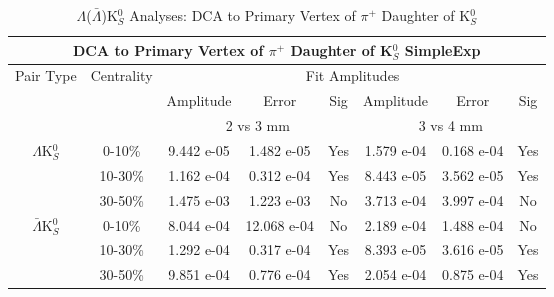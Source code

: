 \documentclass[../AnalysisNoteJBuxton.tex]{subfiles}
\begin{document}
\begin{table}
 \centering
 \begin{tabular}{|c|c|c|c|c||c|c|c|}
  \multicolumn{8}{c}{DCA to Primary Vertex of $\pi^{+}$ Daughter of K$^{0}_{S}$ SimpleExp} \\
  \hline
  \multirow{3}{*}{Pair Type} & \multirow{3}{*}{Centrality} & \multicolumn{6}{c|}{Fit Amplitudes} \\
  \cline{3-8}
   & & Amplitude & Error & Sig & Amplitude & Error & Sig \\  
  \cline{3-8}
   & & \multicolumn{3}{c||}{2 vs 3 mm} & \multicolumn{3}{c|}{3 vs 4 mm} \\  
  \hline  
  \multirow{3}{*}{$\Lambda$K$^{0}_{S}$}  
   &  0-10\% & 9.442 e-05 & 1.482 e-05 & Yes & 1.579 e-04 & 0.168 e-04 & Yes \\
   & 10-30\% & 1.162 e-04 & 0.312 e-04 & Yes & 8.443 e-05 & 3.562 e-05 & Yes \\
   & 30-50\% & 1.475 e-03 & 1.223 e-03 & No & 3.713 e-04 & 3.997 e-04 & No \\
  \hline  
  \multirow{3}{*}{$\bar{\Lambda}$K$^{0}_{S}$}  
   &  0-10\% & 8.044 e-04 & 12.068 e-04 & No & 2.189 e-04 & 1.488 e-04 & No \\
   & 10-30\% & 1.292 e-04 & 0.317 e-04 & Yes & 8.393 e-05 & 3.616 e-05 & Yes \\
   & 30-50\% & 9.851 e-04 & 0.776 e-04 & Yes & 2.054 e-04 & 0.875 e-04 & Yes \\
  \hline
 \end{tabular}
 \caption{$\Lambda$($\bar{\Lambda}$)K$^{0}_{S}$ Analyses: DCA to Primary Vertex of $\pi^{+}$ Daughter of K$^{0}_{S}$}
 \label{tab:DcaToPrimVertexPosPionDaughtOfK0LamK0_SimpleExp}
\end{table}
\end{document}
